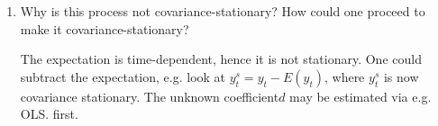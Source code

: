 \begin{enumerate}
    \item Why is this process not covariance-stationary? How could one proceed to make it covariance-stationary?
          \begin{solution}
              The expectation is time-dependent, hence it is not stationary. One could subtract the expectation, e.g. look at $y_{t}^{s} = y_{t} -E(y_t)$, where $y_t^s$ is now covariance stationary. The unknown coefficient$d$ may be estimated via e.g. OLS. first.
          \end{solution}
\end{enumerate}
